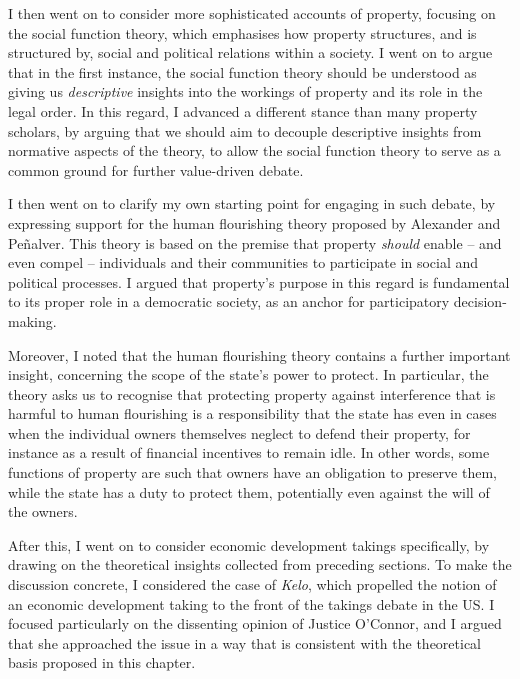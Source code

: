 {I then went on to consider more sophisticated accounts of property, focusing on the social function theory, which emphasises how property structures, and is structured by, social and political relations within a society. I went on to argue that in the first instance, the social function theory should be understood as giving us {\it descriptive} insights into the workings of property and its role in the legal order. In this regard, I advanced a different stance than many property scholars, by arguing that we should aim to decouple descriptive insights from normative aspects of the theory, to allow the social function theory to serve as a common ground for further value-driven debate.

I then went on to clarify my own starting point for engaging in such debate, by expressing support for the human flourishing theory proposed by Alexander and Pe\~{n}alver. This theory is based on the premise that property {\it should} enable -- and even compel -- individuals and their communities to  participate in social and political processes. I argued that property's purpose in this regard is  fundamental to its proper role in a democratic society, as an anchor for participatory decision-making.  

Moreover, I noted that the human flourishing theory contains a further important insight, concerning the scope of the state's power to protect. In particular, the theory asks us to recognise that protecting property against interference that is harmful to human flourishing is a responsibility that the state has even in cases when the individual owners themselves neglect to defend their property, for instance as a result of financial incentives to remain idle. In other words, some functions of property are such that owners have an obligation to preserve them, while the state has a duty to protect them, potentially even against the will of the owners.

After this, I went on to consider economic development takings specifically, by drawing on the theoretical insights collected from preceding sections. To make the discussion concrete, I considered the case of {\it Kelo}, which propelled the notion of an economic development taking to the front of the takings debate in the US. I focused particularly on the dissenting opinion of Justice O'Connor, and I argued that she approached the issue in a way that is consistent with the theoretical basis proposed in this chapter.

}
